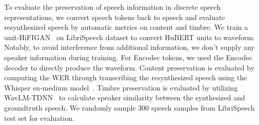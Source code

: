 To evaluate the preservation of speech information in discrete speech representations, we convert speech tokens back to speech and evaluate resynthesized speech by automatic metrics on content and timbre.
We train a unit-HiFIGAN~\citep{polyak2021speech} on LibriSpeech dataset to convert HuBERT units to waveform. Notably, to avoid interference from additional information, we don't supply any speaker information during training. For Encodec tokens, we used the Encodec decoder to
directly produce the waveform.
Content preservation is evaluated by computing the WER through transcribing the resynthesized speech using the Whisper en-medium model~\citep{radford2023robust}. Timbre preservation is evaluated by utilizing WavLM-TDNN~\citep{Chen_2022} to calculate speaker similarity between the synthesized and groundtruth speech. We randomly sample 300 speech samples from LibriSpeech test set for evaluation. 